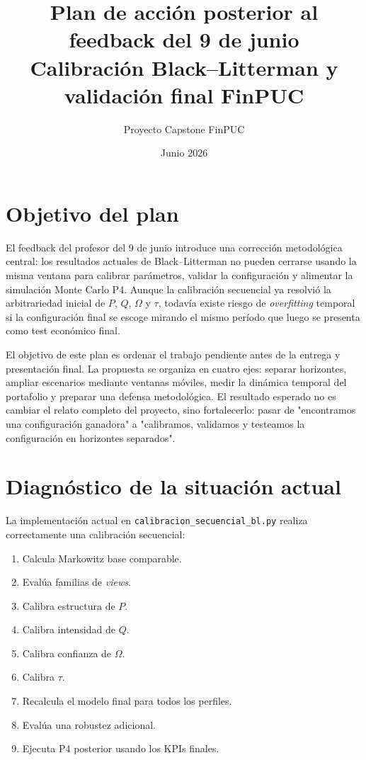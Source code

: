 \documentclass[11pt]{article}
\title{Plan de acci\'on posterior al feedback del 9 de junio\\
Calibraci\'on Black--Litterman y validaci\'on final FinPUC}
\author{Proyecto Capstone FinPUC}
\date{Junio 2026}
\begin{document}
\maketitle

\section{Objetivo del plan}

El feedback del profesor del 9 de junio introduce una correcci\'on metodol\'ogica central: los resultados actuales de Black--Litterman no pueden cerrarse usando la misma ventana para calibrar par\'ametros, validar la configuraci\'on y alimentar la simulaci\'on Monte Carlo P4. Aunque la calibraci\'on secuencial ya resolvi\'o la arbitrariedad inicial de $P$, $Q$, $\Omega$ y $\tau$, todav\'ia existe riesgo de \textit{overfitting} temporal si la configuraci\'on final se escoge mirando el mismo per\'iodo que luego se presenta como test econ\'omico final.

El objetivo de este plan es ordenar el trabajo pendiente antes de la entrega y presentación final. La propuesta se organiza en cuatro ejes: separar horizontes, ampliar escenarios mediante ventanas móviles, medir la dinámica temporal del portafolio y preparar una defensa metodológica. El resultado esperado no es cambiar el relato completo del proyecto, sino fortalecerlo: pasar de "encontramos una configuración ganadora" a "calibramos, validamos y testeamos la configuración en horizontes separados".

\section{Diagn\'ostico de la situaci\'on actual}

La implementaci\'on actual en \texttt{calibracion\_secuencial\_bl.py} realiza correctamente una calibraci\'on secuencial:

\begin{enumerate}[label=\arabic*.]
    \item Calcula Markowitz base comparable.
    \item Eval\'ua familias de \textit{views}.
    \item Calibra estructura de $P$.
    \item Calibra intensidad de $Q$.
    \item Calibra confianza de $\Omega$.
    \item Calibra $\tau$.
    \item Recalcula el modelo final para todos los perfiles.
    \item Eval\'ua una robustez adicional.
    \item Ejecuta P4 posterior usando los KPIs finales.
\end{enumerate}
\end{document}
